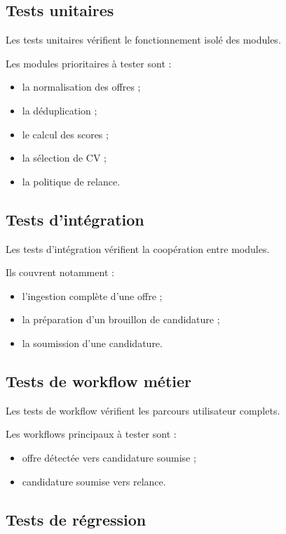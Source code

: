 \documentclass[11pt,a4paper]{article}
\begin{document}
\subsection{Tests unitaires}

Les tests unitaires vérifient le fonctionnement isolé des modules.

Les modules prioritaires à tester sont :

\begin{itemize}
    \item la normalisation des offres ;
    \item la déduplication ;
    \item le calcul des scores ;
    \item la sélection de CV ;
    \item la politique de relance.
\end{itemize}

\subsection{Tests d’intégration}

Les tests d’intégration vérifient la coopération entre modules.

Ils couvrent notamment :

\begin{itemize}
    \item l’ingestion complète d’une offre ;
    \item la préparation d’un brouillon de candidature ;
    \item la soumission d’une candidature.
\end{itemize}

\subsection{Tests de workflow métier}

Les tests de workflow vérifient les parcours utilisateur complets.

Les workflows principaux à tester sont :

\begin{itemize}
    \item offre détectée vers candidature soumise ;
    \item candidature soumise vers relance.
\end{itemize}

\subsection{Tests de régression}
\end{document}
